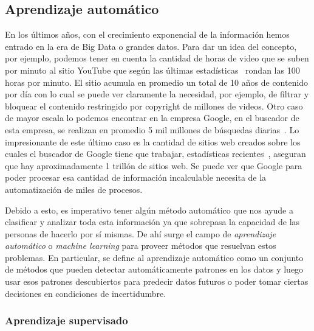 \subsection{Aprendizaje automático}

	En los últimos años, con el crecimiento exponencial de la información hemos entrado en la era de Big Data o grandes datos. Para dar un idea del concepto, por ejemplo, podemos tener en cuenta la cantidad de horas de video que se suben por minuto al sitio YouTube que según las últimas estadísticas~\cite{YoutubeStats} rondan las 100 horas por minuto. El sitio acumula en promedio un total de 10 años de contenido por día con lo cual se puede ver claramente la necesidad, por ejemplo, de filtrar y bloquear el contenido restringido por copyright de millones de videos. Otro caso de mayor escala lo podemos encontrar en la empresa Google, en el buscador de esta empresa, se realizan en promedio 5 mil millones de búsquedas diarias~\cite{GoogleSearches}. Lo impresionante de este último caso es la cantidad de sitios web creados sobre los cuales el buscador de Google tiene que trabajar, estadísticas recientes~\cite{Websites}, aseguran que hay aproximadamente 1 trillón de sitios web. Se puede ver que Google para poder procesar esa cantidad de información incalculable necesita de la automatización de miles de procesos.
	
	 Debido a esto, es imperativo tener algún método automático que nos ayude a clasificar y analizar toda esta información ya que sobrepasa la capacidad de las personas de hacerlo por sí mismas. De ahí surge el campo de \textit{aprendizaje automático} o \textit{machine learning} para proveer métodos que resuelvan estos problemas. En particular, se define al aprendizaje automático como un conjunto de métodos que pueden detectar automáticamente patrones en los datos y luego usar esos patrones descubiertos para predecir datos futuros o poder tomar ciertas decisiones en condiciones de incertidumbre.
	
	
	
	
	\subsubsection{Aprendizaje supervisado}
	
